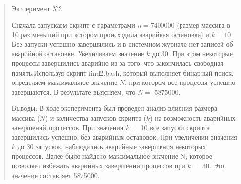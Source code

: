 \documentclass[12pt]{article}
\begin{document}
\begin{quote}
\clearpage

\begin{center}
    \normalsize Эксперимент №2
\end{center}

Сначала запускаем скрипт с параметрами $n = 7400000$ (размер массива в 10 раз меньший при котором происходила аварийная остановка) и $k = 10$. Все запуски успешно завершились и в системном журнале нет записей об аварийной остановке. Увеличиваем значение $k$ до 30. При этом некоторые процессы завершились аварийно из-за того, что закончилась свободная память.Используя скрипт find2.bash, который выполняет бинарный поиск, определяем максимальное значение $N$, при котором все процессы успешно завершаются.
В результате выясняем, что $N =$ 5875000.


Выводы: В ходе эксперимента был проведен анализ влияния размера массива ($N$) и количества запусков скрипта ($k$) на возможность аварийных завершений процессов. При значении $k =$ 10 все запуски скрипта завершились успешно, без аварийных остановок. При увеличении значения $k$ до 30 запусков, наблюдались аварийные завершения некоторых процессов. Далее было найдено максимальное значение N, которое позволяет избежать аварийных завершений процессов при $k =$ 30. Это значение составляет 5875000.

\end{quote}
\end{document}

